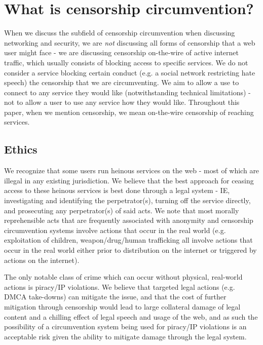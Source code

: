 \documentclass[12pt]{report}
\begin{document}
\section{What is censorship circumvention?}
\label{circumvention}

When we discuss the subfield of censorship circumvention when discussing networking and security, we are \emph{not} discussing all forms of censorship that a web user might face - we are discussing censorship on-the-wire of active internet traffic, which usually consists of blocking access to specific services. We do not consider a service blocking certain conduct (e.g. a social network restricting hate speech) the censorship that we are circumventing. We aim to allow a use to connect to any service they would like (notwithstanding technical limitations) - not to allow a user to use any service how they would like. Throughout this paper, when we mention censorship, we mean on-the-wire censorship of reaching services.

\subsection{Ethics}

We recognize that some users run heinous services on the web - most of which are illegal in any existing jurisdiction. We believe that the best approach for ceasing access to these heinous services is best done through a legal system - IE, investigating and identifying the perpetrator(s), turning off the service directly, and prosecuting any perpetrator(s) of said acts. We note that most morally reprehensible acts that are frequently associated with anonymity and censorship circumvention systems involve actions that occur in the real world (e.g. exploitation of children, weapon/drug/human trafficking all involve actions that occur in the real world either prior to distribution on the internet or triggered by actions on the internet).

The only notable class of crime which can occur without physical, real-world actions is piracy/IP violations. We believe that targeted legal actions (e.g. DMCA take-downs) can mitigate the issue, and that the cost of further mitigation through censorship would lead to large collateral damage of legal content and a chilling effect of legal speech and usage of the web, and as such the possibility of a circumvention system being used for piracy/IP violations is an acceptable risk given the ability to mitigate damage through the legal system.
\end{document}
